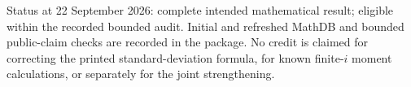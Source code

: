 \documentclass[11pt]{article}
\begin{document}
\medskip\noindent
Status at 22 September 2026: complete intended mathematical result;
eligible within the recorded bounded audit. Initial and refreshed MathDB and
bounded public-claim checks are recorded in the package. No credit is
claimed for correcting the printed standard-deviation formula, for
known finite-\(i\) moment calculations, or separately for the joint
strengthening.
\end{document}
